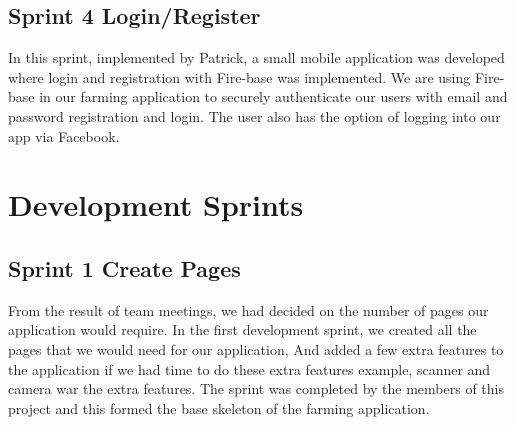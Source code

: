 \documentclass[12pt,a4paper,oneside,openany]{book}
\begin{document}


\subsection{Sprint 4 Login/Register}
In this sprint, implemented by Patrick, a small mobile application was developed where login and registration with Fire-base was implemented. We are using Fire-base in our farming application to securely authenticate our users with email and password registration and login. The user also has the option of logging into our app via Facebook.

\section{Development Sprints}\label{development_sprints}

\subsection{Sprint 1 Create Pages}
From the result of team meetings, we had decided on the number of pages our application would require. In the first development sprint, we created all the pages that we would need for our application, And added a few extra features to the application if we had time to do these extra features example, scanner and camera war the extra features. The sprint was completed by the members of this project and this formed the base skeleton of the farming application.
\end{document}
